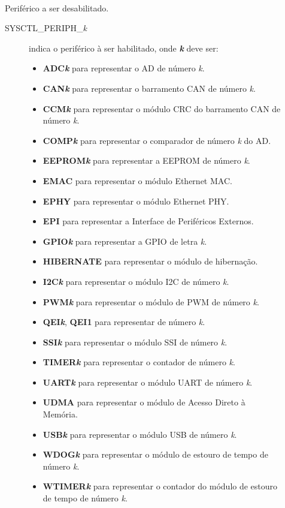 \begin{description}
	\item []\hfill \\
	Periférico a ser desabilitado.
	\begin{description}
		\item [SYSCTL\_PERIPH\_\emph{k}] indica o periférico à ser habilitado, onde \textbf{\emph{k}} deve ser:
		\begin{itemize}
			\item \textbf{ADC\emph{k}} para representar o AD de número \emph{k}.
			\item \textbf{CAN\emph{k}} para representar o barramento CAN de número \emph{k}.
			\item \textbf{CCM\emph{k}} para representar o módulo CRC do barramento CAN de número \emph{k}.
			\item \textbf{COMP\emph{k}} para representar o comparador de número \emph{k} do AD.
			\item \textbf{EEPROM\emph{k}} para representar a EEPROM de número \emph{k}.
			\item \textbf{EMAC} para representar o módulo Ethernet MAC.
			\item \textbf{EPHY} para representar o módulo Ethernet PHY.
			\item \textbf{EPI} para representar a Interface de Periféricos Externos.
			\item \textbf{GPIO\emph{k}} para representar a GPIO de letra \emph{k}.
			\item \textbf{HIBERNATE} para representar o módulo de hibernação.
			\item \textbf{I2C\emph{k}} para representar o módulo I2C de número \emph{k}.
			\item \textbf{PWM\emph{k}} para representar o módulo de PWM de número \emph{k}.
			\item \textbf{QEI\emph{k}}, \textbf{QEI1} para representar  de número \emph{k}.
			\item \textbf{SSI\emph{k}} para representar o módulo SSI de número \emph{k}.
			\item \textbf{TIMER\emph{k}} para representar o contador de número \emph{k}.
			\item \textbf{UART\emph{k}} para representar o módulo UART de número \emph{k}.
			\item \textbf{UDMA} para representar o módulo de Acesso Direto à Memória.
			\item \textbf{USB\emph{k}} para representar o módulo USB de número \emph{k}.
			\item \textbf{WDOG\emph{k}} para representar o módulo de estouro de tempo de número \emph{k}.
			\item \textbf{WTIMER\emph{k}} para representar o contador do módulo de estouro de tempo de número \emph{k}.
		\end{itemize}

	\end{description}
	
\end{description}

